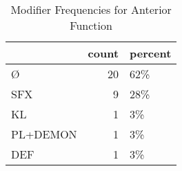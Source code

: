 \begin{table}[htbp!]
\centering
\caption{Modifier Frequencies for Anterior Function}
\label{table:ant_mod_cp}
\begin{tabular}{lrl}
\toprule
{} &  count & percent \\
\midrule
Ø        &     20 &     62\% \\
SFX      &      9 &     28\% \\
KL       &      1 &      3\% \\
PL+DEMON &      1 &      3\% \\
DEF      &      1 &      3\% \\
\bottomrule
\end{tabular}
\end{table}

